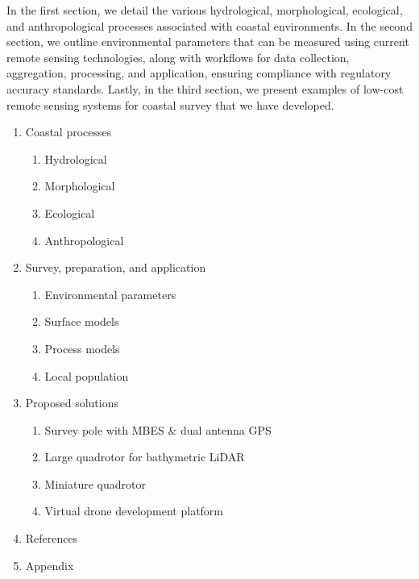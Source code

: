 \documentclass{article}
\begin{document}
\par{In the first section, we detail the various hydrological, morphological, ecological, and anthropological processes associated with coastal environments. In the second section, we outline environmental parameters that can be measured using current remote sensing technologies, along with workflows for data collection, aggregation, processing, and application, ensuring compliance with regulatory accuracy standards. Lastly, in the third section, we present examples of low-cost remote sensing systems for coastal survey that we have developed.} 

\thispagestyle{fancy}

\newpage
{}
\thispagestyle{fancy}
\begin{enumerate}
    \item{Coastal processes}
    \begin{enumerate}
        \item{Hydrological}
        \item{Morphological}
        \item{Ecological}
        \item{Anthropological}
    \end{enumerate}

    \item{Survey, preparation, and application}
    \begin{enumerate}
        \item{Environmental parameters}
        \item{Surface models}
        \item{Process models}
        \item{Local population}
    \end{enumerate}

    \item Proposed solutions
    \begin{enumerate}
        \item{Survey pole with MBES \& dual antenna GPS}
        \item{Large quadrotor for bathymetric LiDAR}
        \item{Miniature quadrotor}
        \item{Virtual drone development platform}
    \end{enumerate}

    \item{References}
    \item{Appendix}
\end{enumerate}
\end{document}
